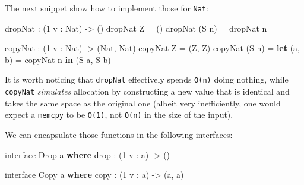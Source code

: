 \documentclass[
]{article}
\newenvironment{Shaded}{}{}
\newcommand{\DataTypeTok}[1]{\textcolor[rgb]{0.56,0.13,0.00}{#1}}
\newcommand{\DecValTok}[1]{\textcolor[rgb]{0.25,0.63,0.44}{#1}}
\newcommand{\FunctionTok}[1]{\textcolor[rgb]{0.02,0.16,0.49}{#1}}
\newcommand{\KeywordTok}[1]{\textcolor[rgb]{0.00,0.44,0.13}{\textbf{#1}}}
\newcommand{\NormalTok}[1]{#1}
\newcommand{\OperatorTok}[1]{\textcolor[rgb]{0.40,0.40,0.40}{#1}}
\newcommand{\OtherTok}[1]{\textcolor[rgb]{0.00,0.44,0.13}{#1}}
\begin{document}
The next snippet show how to implement those for \texttt{Nat}:

\begin{Shaded}
\begin{Highlighting}[]
\NormalTok{dropNat }\OperatorTok{:}\NormalTok{ (}\DecValTok{1}\NormalTok{ v }\OperatorTok{:} \DataTypeTok{Nat}\NormalTok{) }\OtherTok{{-}\textgreater{}}\NormalTok{ ()}
\NormalTok{dropNat }\DataTypeTok{Z} \OtherTok{=}\NormalTok{ ()}
\NormalTok{dropNat (}\DataTypeTok{S}\NormalTok{ n) }\OtherTok{=}\NormalTok{ dropNat n}

\NormalTok{copyNat }\OperatorTok{:}\NormalTok{ (}\DecValTok{1}\NormalTok{ v }\OperatorTok{:} \DataTypeTok{Nat}\NormalTok{) }\OtherTok{{-}\textgreater{}}\NormalTok{ (}\DataTypeTok{Nat}\NormalTok{, }\DataTypeTok{Nat}\NormalTok{)}
\NormalTok{copyNat }\DataTypeTok{Z} \OtherTok{=}\NormalTok{ (}\DataTypeTok{Z}\NormalTok{, }\DataTypeTok{Z}\NormalTok{)}
\NormalTok{copyNat (}\DataTypeTok{S}\NormalTok{ n) }\OtherTok{=} \KeywordTok{let}\NormalTok{ (a, b) }\OtherTok{=}\NormalTok{ copyNat n }\KeywordTok{in}
\NormalTok{                    (}\DataTypeTok{S}\NormalTok{ a, }\DataTypeTok{S}\NormalTok{ b)}
\end{Highlighting}
\end{Shaded}

It is worth noticing that \texttt{dropNat} effectively spends
\texttt{O(n)} doing nothing, while \texttt{copyNat} \emph{simulates}
allocation by constructing a new value that is identical and takes the
same space as the original one (albeit very inefficiently, one would
expect a \texttt{memcpy} to be \texttt{O(1)}, not \texttt{O(n)} in the
size of the input).

We can encapsulate those functions in the following interfaces:

\begin{Shaded}
\begin{Highlighting}[]
\NormalTok{interface }\DataTypeTok{Drop}\NormalTok{ a }\KeywordTok{where}
    \FunctionTok{drop} \OperatorTok{:}\NormalTok{ (}\DecValTok{1}\NormalTok{ v }\OperatorTok{:}\NormalTok{ a) }\OtherTok{{-}\textgreater{}}\NormalTok{ ()}

\NormalTok{interface }\DataTypeTok{Copy}\NormalTok{ a }\KeywordTok{where}
\NormalTok{    copy }\OperatorTok{:}\NormalTok{ (}\DecValTok{1}\NormalTok{ v }\OperatorTok{:}\NormalTok{ a) }\OtherTok{{-}\textgreater{}}\NormalTok{ (a, a)}
\end{Highlighting}
\end{Shaded}
\end{document}
